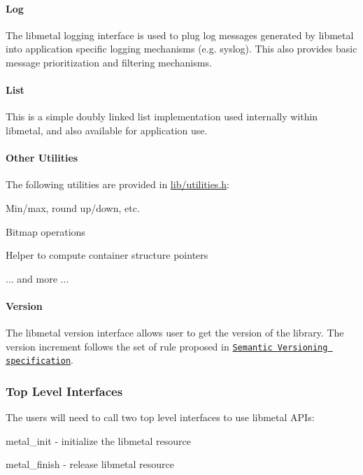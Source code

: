\paragraph*{Log}

The libmetal logging interface is used to plug log messages generated by libmetal into application specific logging mechanisms (e.\+g. syslog). This also provides basic message prioritization and filtering mechanisms.

\paragraph*{List}

This is a simple doubly linked list implementation used internally within libmetal, and also available for application use.

\paragraph*{Other Utilities}

The following utilities are provided in \hyperlink{utilities_8h}{lib/utilities.\+h}\+:
\begin{DoxyItemize}
\item Min/max, round up/down, etc.
\item Bitmap operations
\item Helper to compute container structure pointers
\item ... and more ...
\end{DoxyItemize}

\paragraph*{Version}

The libmetal version interface allows user to get the version of the library. The version increment follows the set of rule proposed in \href{https://semver.org/}{\tt Semantic Versioning specification}.

\subsubsection*{Top Level Interfaces}

The users will need to call two top level interfaces to use libmetal A\+P\+Is\+:
\begin{DoxyItemize}
\item metal\+\_\+init -\/ initialize the libmetal resource
\item metal\+\_\+finish -\/ release libmetal resource
\end{DoxyItemize}

